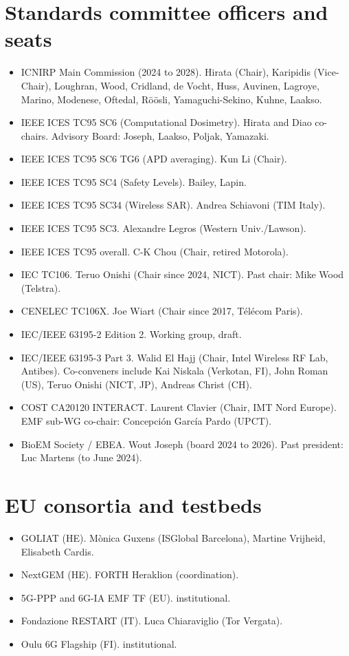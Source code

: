 \documentclass[10pt,a4paper]{article}
\begin{document}
\section{Standards committee officers and seats}
\begin{itemize}
  \item ICNIRP Main Commission (2024 to 2028). Hirata (Chair), Karipidis (Vice-Chair), Loughran, Wood, Cridland, de Vocht, Huss, Auvinen, Lagroye, Marino, Modenese, Oftedal, R\"o\"osli, Yamaguchi-Sekino, Kuhne, Laakso.
  \item IEEE ICES TC95 SC6 (Computational Dosimetry). Hirata and Diao co-chairs. Advisory Board: Joseph, Laakso, Poljak, Yamazaki.
  \item IEEE ICES TC95 SC6 TG6 (APD averaging). Kun Li (Chair).
  \item IEEE ICES TC95 SC4 (Safety Levels). Bailey, Lapin.
  \item IEEE ICES TC95 SC34 (Wireless SAR). Andrea Schiavoni (TIM Italy).
  \item IEEE ICES TC95 SC3. Alexandre Legros (Western Univ./Lawson).
  \item IEEE ICES TC95 overall. C-K Chou (Chair, retired Motorola).
  \item IEC TC106. Teruo Onishi (Chair since 2024, NICT). Past chair: Mike Wood (Telstra).
  \item CENELEC TC106X. Joe Wiart (Chair since 2017, T\'el\'ecom Paris).
  \item IEC/IEEE 63195-2 Edition 2. Working group, draft.
  \item IEC/IEEE 63195-3 Part 3. Walid El Hajj (Chair, Intel Wireless RF Lab, Antibes). Co-conveners include Kai Niskala (Verkotan, FI), John Roman (US), Teruo Onishi (NICT, JP), Andreas Christ (CH).
  \item COST CA20120 INTERACT. Laurent Clavier (Chair, IMT Nord Europe). EMF sub-WG co-chair: Concepci\'on Garc\'ia Pardo (UPCT).
  \item BioEM Society / EBEA. Wout Joseph (board 2024 to 2026). Past president: Luc Martens (to June 2024).
\end{itemize}

\section{EU consortia and testbeds}
\begin{itemize}
  \item GOLIAT (HE). M\`onica Guxens (ISGlobal Barcelona), Martine Vrijheid, Elisabeth Cardis.
  \item NextGEM (HE). FORTH Heraklion (coordination).
  \item 5G-PPP and 6G-IA EMF TF (EU). institutional.
  \item Fondazione RESTART (IT). Luca Chiaraviglio (Tor Vergata).
  \item Oulu 6G Flagship (FI). institutional.
\end{itemize}
\end{document}
